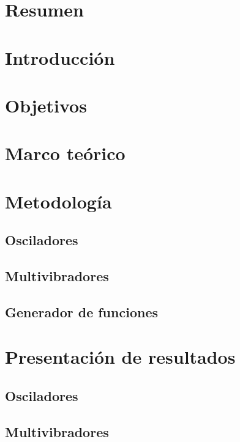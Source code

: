 \documentclass{article}
\begin{document}

\tableofcontents
\newpage
\section{Resumen}


\section{Introducción}


\section{Objetivos}


\section {Marco teórico}




\section{Metodología}
\subsection{Osciladores}

\FloatBarrier
\subsection{Multivibradores}

\FloatBarrier
\subsection{Generador de funciones}

\FloatBarrier



\section{Presentación de resultados}
\subsection{Osciladores}

\FloatBarrier
\subsection{Multivibradores}

\FloatBarrier
\end{document}
